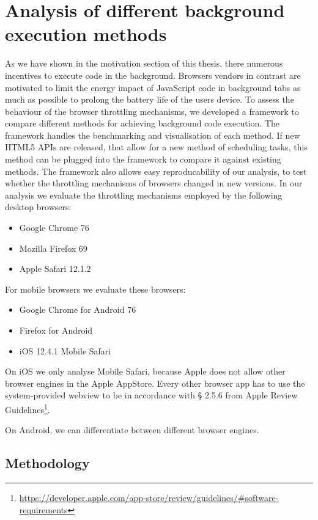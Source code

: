 \documentclass[article,type=bsc,colorback,accentcolor=tud9c]{tudthesis}
\begin{document}
  
  \newpage
  \section{Analysis of different background execution methods}

  As we have shown in the motivation section of this thesis, there numerous incentives to execute code in the background. Browsers vendors in contrast are motivated to limit the energy impact of JavaScript code in background tabs as much as possible to prolong the battery life of the users device. To assess the behaviour of the browser throttling mechanisms, we developed a framework to compare different methods for achieving background code execution. The framework handles the benchmarking and visualisation of each method. If new HTML5 APIs are released, that allow for a new method of scheduling tasks, this method can be plugged into the framework to compare it against existing methods. The framework also allows easy reproducability of our analysis, to test whether the throttling mechanisms of browsers changed in new versions. In our analysis we evaluate the throttling mechanisms employed by the following desktop browsers:

  \begin{itemize}
  \item Google Chrome 76
  \item Mozilla Firefox 69
  \item Apple Safari 12.1.2
  \end{itemize}

  For mobile browsers we evaluate these browsers:

  \begin{itemize}
  \item Google Chrome for Android 76
  \item Firefox for Android
  \item iOS 12.4.1 Mobile Safari
  \end{itemize}

  On iOS we only analyse Mobile Safari, because Apple does not allow other browser engines in the Apple AppStore. Every other browser app has to use the system-provided webview to be in accordance with § 2.5.6 from Apple Review Guidelines\footnote{\url{https://developer.apple.com/app-store/review/guidelines/\#software-requirements}}.

  On Android, we can differentiate between different browser engines.
  
  
  \subsection{Methodology}
\end{document}
